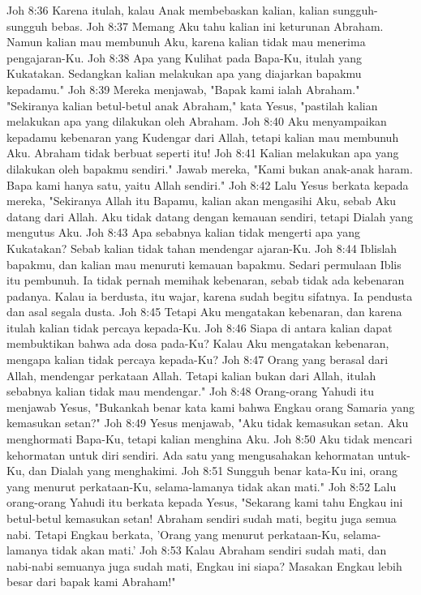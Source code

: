 Joh 8:36  Karena itulah, kalau Anak membebaskan kalian, kalian sungguh-sungguh bebas.
Joh 8:37  Memang Aku tahu kalian ini keturunan Abraham. Namun kalian mau membunuh Aku, karena kalian tidak mau menerima pengajaran-Ku.
Joh 8:38  Apa yang Kulihat pada Bapa-Ku, itulah yang Kukatakan. Sedangkan kalian melakukan apa yang diajarkan bapakmu kepadamu."
Joh 8:39  Mereka menjawab, "Bapak kami ialah Abraham." "Sekiranya kalian betul-betul anak Abraham," kata Yesus, "pastilah kalian melakukan apa yang dilakukan oleh Abraham.
Joh 8:40  Aku menyampaikan kepadamu kebenaran yang Kudengar dari Allah, tetapi kalian mau membunuh Aku. Abraham tidak berbuat seperti itu!
Joh 8:41  Kalian melakukan apa yang dilakukan oleh bapakmu sendiri." Jawab mereka, "Kami bukan anak-anak haram. Bapa kami hanya satu, yaitu Allah sendiri."
Joh 8:42  Lalu Yesus berkata kepada mereka, "Sekiranya Allah itu Bapamu, kalian akan mengasihi Aku, sebab Aku datang dari Allah. Aku tidak datang dengan kemauan sendiri, tetapi Dialah yang mengutus Aku.
Joh 8:43  Apa sebabnya kalian tidak mengerti apa yang Kukatakan? Sebab kalian tidak tahan mendengar ajaran-Ku.
Joh 8:44  Iblislah bapakmu, dan kalian mau menuruti kemauan bapakmu. Sedari permulaan Iblis itu pembunuh. Ia tidak pernah memihak kebenaran, sebab tidak ada kebenaran padanya. Kalau ia berdusta, itu wajar, karena sudah begitu sifatnya. Ia pendusta dan asal segala dusta.
Joh 8:45  Tetapi Aku mengatakan kebenaran, dan karena itulah kalian tidak percaya kepada-Ku.
Joh 8:46  Siapa di antara kalian dapat membuktikan bahwa ada dosa pada-Ku? Kalau Aku mengatakan kebenaran, mengapa kalian tidak percaya kepada-Ku?
Joh 8:47  Orang yang berasal dari Allah, mendengar perkataan Allah. Tetapi kalian bukan dari Allah, itulah sebabnya kalian tidak mau mendengar."
Joh 8:48  Orang-orang Yahudi itu menjawab Yesus, "Bukankah benar kata kami bahwa Engkau orang Samaria yang kemasukan setan?"
Joh 8:49  Yesus menjawab, "Aku tidak kemasukan setan. Aku menghormati Bapa-Ku, tetapi kalian menghina Aku.
Joh 8:50  Aku tidak mencari kehormatan untuk diri sendiri. Ada satu yang mengusahakan kehormatan untuk-Ku, dan Dialah yang menghakimi.
Joh 8:51  Sungguh benar kata-Ku ini, orang yang menurut perkataan-Ku, selama-lamanya tidak akan mati."
Joh 8:52  Lalu orang-orang Yahudi itu berkata kepada Yesus, "Sekarang kami tahu Engkau ini betul-betul kemasukan setan! Abraham sendiri sudah mati, begitu juga semua nabi. Tetapi Engkau berkata, 'Orang yang menurut perkataan-Ku, selama-lamanya tidak akan mati.'
Joh 8:53  Kalau Abraham sendiri sudah mati, dan nabi-nabi semuanya juga sudah mati, Engkau ini siapa? Masakan Engkau lebih besar dari bapak kami Abraham!"
